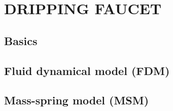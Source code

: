\chapter{DRIPPING FAUCET}

\section{Basics}
\section{Fluid dynamical model (FDM)}
\section{Mass-spring model (MSM)}

\thispagestyle{empty}
